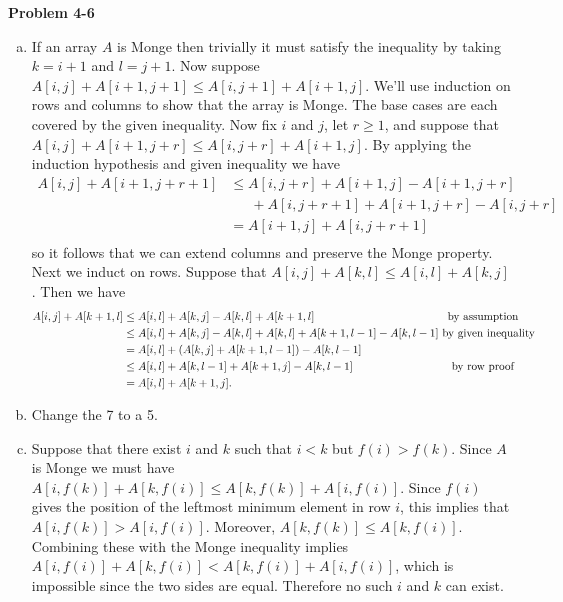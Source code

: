 \documentclass{article}
\begin{document}
\noindent\textbf{Problem 4-6}\\
\begin{enumerate}[a.]
\item If an array $A$ is Monge then trivially it must satisfy the inequality by taking $k = i+1$ and $l = j+1$.  Now suppose $A[i,j] + A[i+1,j+1] \leq A[i,j+1] + A[i+1,j]$.  We'll use induction on rows and columns to show that the array is Monge.  The base cases are each covered by the given inequality.  Now fix $i$ and $j$, let $r \geq 1$, and suppose that $A[i,j] + A[i+1,j+r] \leq A[i,j+r] + A[i+1,j]$.  By applying the induction hypothesis and given inequality we have
\begin{align*}
A[i,j] + A[i+1,j+r+1] &\leq  A[i,j+r] + A[i+1,j] -  A[i+1,j+r]\\
& \,\,\,\,\,\,\,\,\,+ A[i, j+r+1] + A[i+1, j+r] - A[i, j+r] \\
&=  A[i+1,j] + A[i, j+r+1]  \\
\end{align*}
so it follows that we can extend columns and preserve the Monge property.  Next we induct on rows.  Suppose that $A[i,j] + A[k,l] \leq A[i,l] + A[k,j]$.  Then we have
\begin{align*}
A[i,j] + A[k+1,l] &\leq A[i,l] + A[k,j] - A[k,l] +  A[k+1,l] \hspace{4.2cm} \mbox{by assumption} \\
&\leq  A[i,l] + A[k,j] - A[k,l] + A[k,l] + A[k+1,l-1] - A[k,l-1] \mbox{ by given inequality} \\
&=  A[i,l] + (A[k,j] + A[k+1,l-1]) - A[k,l-1] \\
&\leq A[i,l] + A[k,l-1] + A[k+1,j] - A[k,l-1] \hspace{3cm} \mbox{ by row proof} \\
&= A[i,l] + A[k+1,j].
\end{align*}

\item Change the 7 to a 5. \\

\item Suppose that there exist $i$ and $k$ such that $i < k$ but $f(i) > f(k)$.  Since $A$ is Monge we must have $A[i,f(k)] + A[k,f(i)] \leq A[k,f(k)] + A[i,f(i)]$. Since $f(i)$ gives the position of the leftmost minimum element in row $i$, this implies that $A[i,f(k)] > A[i,f(i)]$.  Moreover, $A[k, f(k)] \leq A[k,f(i)]$.  Combining these with the Monge inequality implies $A[i,f(i)] + A[k,f(i)] < A[k,f(i)] + A[i,f(i)]$, which is impossible since the two sides are equal.  Therefore no such $i$ and $k$ can exist. \\


\end{enumerate}
\end{document}
